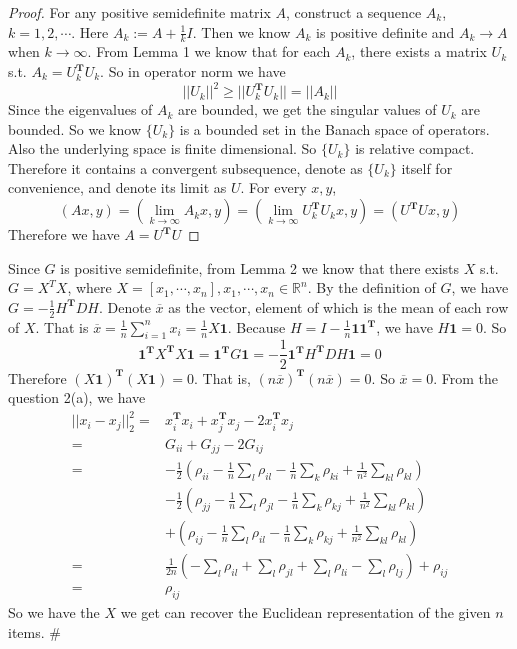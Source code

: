 \documentclass[twoside,11pt]{homework}
\begin{document}
\begin{proof}
For any positive semidefinite matrix $A$, construct a sequence ${A_k}$, $k=1,2,\cdots$. Here $A_k:=A+\frac{1}{k}I$. Then we know $A_k$ is positive definite and $A_k \rightarrow A$ when $k \rightarrow \infty$.
From Lemma 1 we know that for each $A_k$, there exists a matrix $U_k$ s.t. $A_k=U_k^\mathbf{T}U_k$. So in operator norm we have 
$$||U_k||^2 \geq ||U_k^\mathbf{T}U_k|| = ||A_k||$$
Since the eigenvalues of $A_k$ are bounded, we get the singular values of $U_k$ are bounded. So we know $\{U_k\}$ is a bounded set in the Banach space of operators. Also the underlying space is finite dimensional. So $\{U_k\}$ is relative compact. Therefore it contains a convergent subsequence, denote as $\{U_k\}$ itself for convenience, and denote its limit as $U$. For every $x,y$,
$$(Ax,y)=(\underset{k\rightarrow \infty}{\lim}A_kx,y) = (\underset{k\rightarrow \infty}{\lim}U_k^\mathbf{T}U_k x,y) = (U^\mathbf{T}Ux,y)$$
Therefore we have $A = U^\mathbf{T}U$
\end{proof}
Since $G$ is positive semidefinite, from Lemma 2 we know that there exists $X$ s.t. $G = X^TX$, where $X = [x_1, \cdots, x_n],x_1,\cdots,x_n \in \mathbb{R}^n$. By the definition of $G$, we have $G=-\frac{1}{2}H^\mathbf{T}DH$. Denote $\overline{x}$ as the vector, element of which is the mean of each row of $X$. That is $\overline{x} = \frac{1}{n}\sum_{i=1}^n x_i=\frac{1}{n}X\mathbf{1}$.
Because $H = I - \frac{1}{n}\mathbf{1}\mathbf{1}^\mathbf{T}$, we have $H\mathbf{1} = 0$. So
$$ \mathbf{1}^\mathbf{T}X^{\mathbf{T}}X\mathbf{1} = \mathbf{1}^\mathbf{T}G\mathbf{1} =-\frac{1}{2}\mathbf{1}^\mathbf{T}H^\mathbf{T}DH\mathbf{1} = 0$$
Therefore $(X\mathbf{1})^\mathbf{T}(X\mathbf{1}) = 0$. That is, $(n\overline{x})^{\mathbf{T}}(n\overline{x})=0$. So $\overline{x}=0$.
From the question 2(a), we have
\begin{align*}
    ||x_i-x_j||_2^2 =& x_i^\mathbf{T}x_i + x_j^\mathbf{T}x_j - 2x_i^\mathbf{T}x_j\\
    =& G_{ii} + G_{jj} - 2G_{ij}\\
    =& -\frac{1}{2}(\rho_{ii} - \frac{1}{n}\sum_{l}\rho_{il} - \frac{1}{n}\sum_{k}\rho_{ki} + \frac{1}{n^2}\sum_{kl}\rho_{kl})\\
    &-\frac{1}{2}(\rho_{jj} - \frac{1}{n}\sum_{l}\rho_{jl} - \frac{1}{n}\sum_{k}\rho_{kj} + \frac{1}{n^2}\sum_{kl}\rho_{kl})\\
    &+(\rho_{ij} -  \frac{1}{n}\sum_{l}\rho_{il} - \frac{1}{n}\sum_{k}\rho_{kj} + \frac{1}{n^2}\sum_{kl}\rho_{kl})\\
    =& \frac{1}{2n}(-\sum_l \rho_{il}+\sum_{l} \rho_{jl}+\sum_{l}\rho_{li}-\sum_l \rho_{lj})+\rho_{ij}\\
    =&\rho_{ij}
\end{align*}
So we have the $X$ we get can recover the Euclidean representation of the given $n$ items. \#
\end{document}
